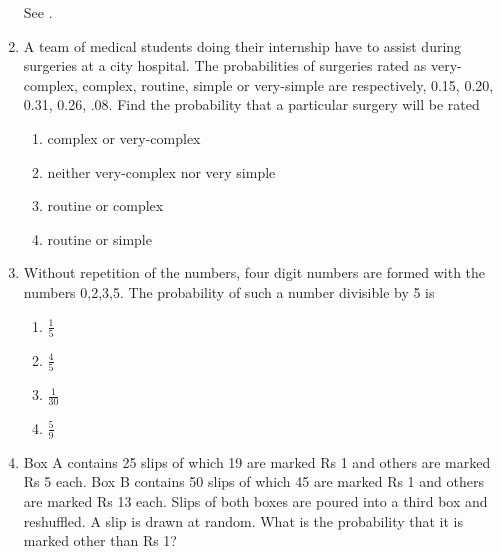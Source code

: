 \begin{enumerate}[label=\thesubsection.\arabic*,ref=\thesubsection.\theenumi,resume*]
See .
\begin{table}[htb]\centering

%	
	\caption{}
\label{tab:ncert/12/13/2/15}
\end{table}	
%
	\item A team of medical students doing their internship have to assist during surgeries at a city hospital. The probabilities of surgeries rated as very-complex, complex, routine, simple or very-simple are respectively, 0.15, 0.20, 0.31, 0.26, .08. Find the probability that a particular surgery will be rated
		\begin{multicols}{2}
\begin{enumerate}
\item complex or very-complex
\item neither very-complex nor very simple
\item routine or complex
\item routine or simple
\end{enumerate}
\end{multicols}
		\solution
		
\begin{table}[htb]\centering
	
	\caption{}
	\label{tab:exemplar/11/16/3/8/table2}
\end{table}	
\item Without repetition of the numbers, four digit numbers are formed with the numbers 0,2,3,5. The
probability of such a number divisible by 5 is
		\begin{multicols}{4}
\begin{enumerate}
\item $\frac{1}{5}$ 
\item $\frac{4}{5}$
\item $\frac{1}{30}$ 
\item $\frac{5}{9}$
\end{enumerate}
		\end{multicols}
\solution

\item Box A contains 25 slips of which 19 are marked Rs 1 and others are marked Rs 5 each. Box B contains 50 slips of which 45 are marked Rs 1 and others are marked Rs 13 each. Slips of both boxes are poured into a third box and reshuffled. A slip is drawn at random. What is the probability that it is marked other than Rs 1?
%
\end{enumerate}
